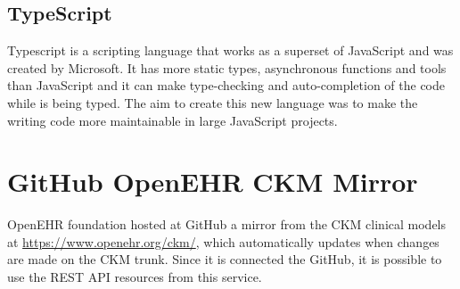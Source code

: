 \documentclass[mim_thesis.tex]{subfiles}
\begin{document}
\subsection{TypeScript}
Typescript is a scripting language that works as a superset of JavaScript and was created by Microsoft. It has more static types, asynchronous functions and tools than JavaScript and it can make type-checking and auto-completion of the code while is being typed. The aim to create this new language was to make the writing code more maintainable in large JavaScript projects.


\section{GitHub OpenEHR CKM Mirror}
OpenEHR foundation hosted at GitHub a mirror from the CKM clinical models at \url{https://www.openehr.org/ckm/}, which automatically updates when changes are made on the CKM trunk. Since it is connected the GitHub, it is possible to use the REST API resources from this service.
\end{document}
